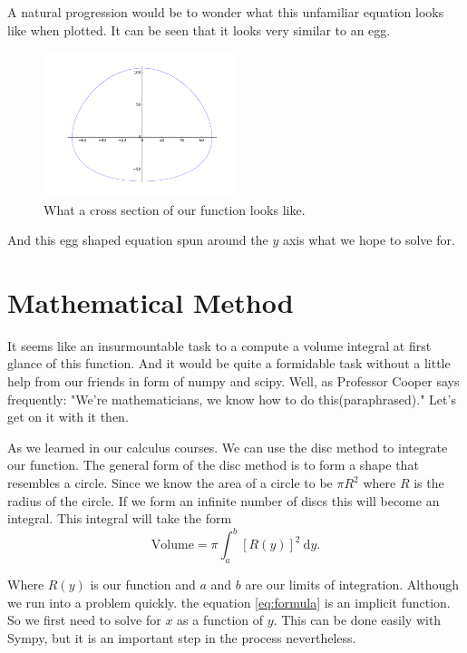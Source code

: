 \documentclass[10pt, reqno]{article}
\numberwithin{equation}{section}
\numberwithin{figure}{section}
\begin{document}
A natural progression would be to wonder what this unfamiliar equation looks like when plotted. It can be seen that it looks very similar to an egg. %

\begin{figure}[H] %
\centering
\includegraphics[width=0.5\textwidth]{cross_section.png}
\caption{What a cross section of our function looks like.}
\end{figure}

\noindent And this egg shaped equation spun around the $y$ axis what we hope to solve for. 


\section{Mathematical Method}

It seems like an insurmountable task to a compute a volume integral at first glance of this function. And it would be quite a formidable task without a little help from our friends in form of numpy and scipy. Well, as Professor Cooper says frequently: "We're mathematicians, we know how to do this(paraphrased)." Let's get on it with it then. 

As we learned in our calculus courses. We can use the disc method to integrate our function. The general form of the disc method is to form a shape that resembles a circle. Since we know the area of a circle to be $\pi R^2$ where $R$ is the radius of the circle. If we form an infinite number of discs this will become an integral. This integral will take the form 
\begin{equation}
\label{eq:formula}
\mathrm{Volume}=\pi\int_a^b [R(y)]^2\ \mathrm{d}y. 
\end{equation}

\noindent Where $R(y)$ is our function and $a$ and $b$ are our limits of integration. Although we run into a problem quickly. the equation \ref{eq:formula} is an implicit function. So we first need to solve for $x$ as a function of $y$. This can be done easily with Sympy, but it is an important step in the process nevertheless. 
\end{document}
